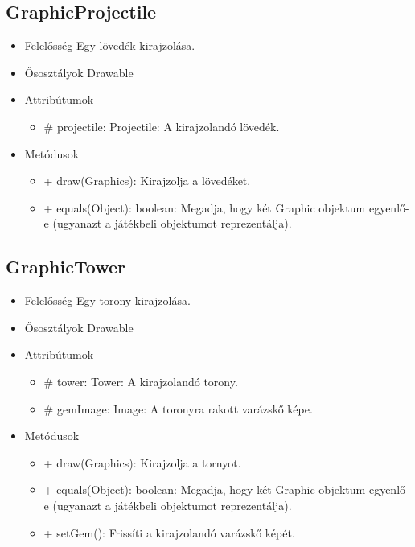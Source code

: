 \subsection{GraphicProjectile}
\begin{itemize}
\item Felelősség \newline
Egy lövedék kirajzolása.
\item Ősosztályok\newline
Drawable
\item Attribútumok
	\begin{itemize}
		\item \# projectile: Projectile: A kirajzolandó lövedék.
	\end{itemize}
\item Metódusok
	\begin{itemize}
		\item + draw(Graphics): Kirajzolja a lövedéket.
		\item + equals(Object): boolean: Megadja, hogy két Graphic objektum egyenlő-e (ugyanazt a játékbeli objektumot reprezentálja).
	\end{itemize}
\end{itemize}

\subsection{GraphicTower}
\begin{itemize}
\item Felelősség \newline
Egy torony kirajzolása.
\item Ősosztályok\newline
Drawable
\item Attribútumok
	\begin{itemize}
		\item \# tower: Tower: A kirajzolandó torony.
		\item \# gemImage: Image: A toronyra rakott varázskő képe.
	\end{itemize}
\item Metódusok
	\begin{itemize}
		\item + draw(Graphics): Kirajzolja a tornyot.
		\item + equals(Object): boolean: Megadja, hogy két Graphic objektum egyenlő-e (ugyanazt a játékbeli objektumot reprezentálja).
		\item + setGem(): Frissíti a kirajzolandó varázskő képét.
	\end{itemize}
\end{itemize}


